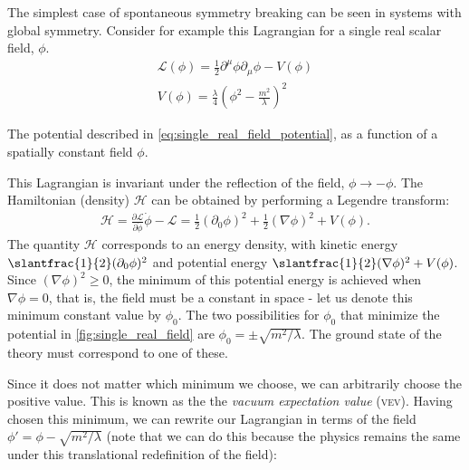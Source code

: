 The simplest case of spontaneous symmetry breaking can be seen in systems with global symmetry. Consider for example this Lagrangian for a single real scalar field, $\phi$.
\begin{align}
\mathcal{L}(\phi) = \frac{1}{2}\partial^\mu\phi\partial_\mu\phi - V(\phi)\\
V(\phi) = \frac{\lambda}{4}\left(\phi^2 - \frac{m^2}{\lambda}\right)^2
\label{eq:single_real_field_potential}
\end{align}

\begin{marginfigure}
\caption{The potential described in \autoref{eq:single_real_field_potential}, as a function of a spatially constant field $\phi$.}
\label{fig:single_real_field}
\end{marginfigure}
This Lagrangian is invariant under the reflection of the field, $\phi\rightarrow -\phi$. The Hamiltonian (density) $\mathcal{H}$ can be obtained by performing a Legendre transform:
\begin{align}
\mathcal{H} = \frac{\partial\mathcal{L}}{\partial\dot{\phi}}\dot{\phi} - \mathcal{L} = \frac{1}{2}(\partial_0\phi)^2+ \frac{1}{2}(\nabla\phi)^2+ V(\phi).
\end{align}
The quantity $\mathcal{H}$ corresponds to an energy density, with kinetic energy $\slantfrac{1}{2}(\partial_0\phi)^2$ and potential energy $\slantfrac{1}{2}(\nabla\phi)^2 + V(\phi)$. Since $(\nabla\phi)^2 \geq 0$, the minimum of this potential energy is achieved when $\nabla\phi = 0$, that is, the field must be a constant in space - let us denote this minimum constant value by $\phi_0$. The two possibilities for $\phi_0$ that minimize the potential in \autoref{fig:single_real_field} are $\phi_0 = \pm\sqrt{m^2/\lambda}$. The ground state of the theory must correspond to one of these.

Since it does not matter which minimum we choose, we can arbitrarily choose the positive value. This is known as the the \emph{vacuum expectation value} (\textsc{vev}). Having chosen this minimum, we can rewrite our Lagrangian in terms of the field $\phi' = \phi - \sqrt{m^2/\lambda}$ (note that we can do this because the physics remains the same under this translational redefinition of the field):

